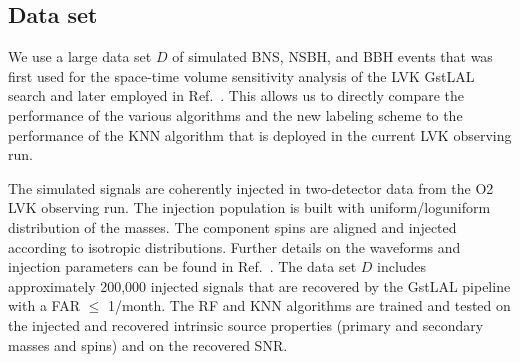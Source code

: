 \subsection{Data set\label{dataset}}
\label{sec:dataset}

We use a large data set $D$ of simulated \ac{BNS}, \ac{NSBH}, and \ac{BBH} events that was first used for the space-time volume sensitivity analysis of the \ac{LVK} GstLAL search
 and later employed in Ref.~\cite{Chatterjee:2019avs}. This allows us to directly compare the performance of the various algorithms and the new labeling
scheme to the performance of the \ac{KNN} algorithm that is deployed in the current \ac{LVK} observing run. 

The simulated signals are coherently injected in two-detector data from the \ac{O2} \ac{LVK} observing run. The injection population is built with uniform/loguniform  distribution of the  masses. The component spins are aligned and injected according to isotropic
distributions. Further details on the waveforms and injection parameters can be found in Ref.~\cite{Chatterjee:2019avs}. The data set $D$ includes approximately 200,000 injected signals
that are recovered by the GstLAL pipeline with a \ac{FAR} $\le$ 1/month. The \ac{RF} and \ac{KNN} algorithms are trained and tested on the injected and recovered intrinsic source
properties (primary and secondary masses and spins) and on the recovered \ac{SNR}. 

